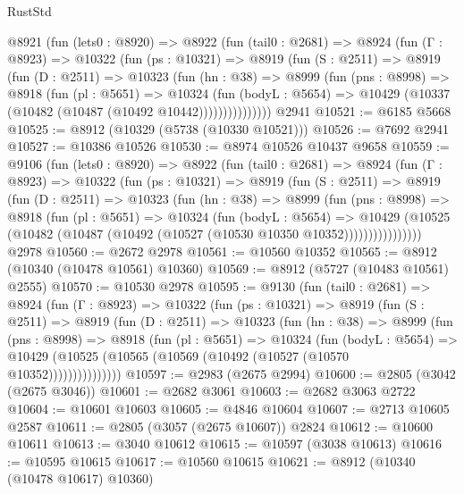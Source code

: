 \begin{lexlean}{RustStd}
\begin{coremodule}
    @8921
      (fun (lets0 : @8920) =>
      @8922
        (fun (tail0 : @2681) =>
        @8924
          (fun (Γ : @8923) =>
          @10322
            (fun (ps : @10321) =>
            @8919
              (fun (S : @2511) =>
              @8919
                (fun (D : @2511) =>
                @10323
                  (fun (hn : @38) =>
                  @8999
                    (fun (pns : @8998) =>
                    @8918
                      (fun (pl : @5651) =>
                      @10324
                        (fun (bodyL : @5654) =>
                        @10429 (@10337 (@10482 (@10487 (@10492 @10442)))))))))))))))
    @2941
@10521 := @6185 @5668
@10525 := @8912 (@10329 (@5738 (@10330 @10521)))
@10526 := @7692 @2941
@10527 := @10386 @10526
@10530 := @8974 @10526 @10437 @9658
@10559 := @9106
    (fun (lets0 : @8920) =>
    @8922
      (fun (tail0 : @2681) =>
      @8924
        (fun (Γ : @8923) =>
        @10322
          (fun (ps : @10321) =>
          @8919
            (fun (S : @2511) =>
            @8919
              (fun (D : @2511) =>
              @10323
                (fun (hn : @38) =>
                @8999
                  (fun (pns : @8998) =>
                  @8918
                    (fun (pl : @5651) =>
                    @10324
                      (fun (bodyL : @5654) =>
                      @10429
                        (@10525
                          (@10482 (@10487 (@10492 (@10527 (@10530 @10350 @10352))))))))))))))))
    @2978
@10560 := @2672 @2978
@10561 := @10560 @10352
@10565 := @8912 (@10340 (@10478 @10561) @10360)
@10569 := @8912 (@5727 (@10483 @10561) @2555)
@10570 := @10530 @2978
@10595 := @9130
    (fun (tail0 : @2681) =>
    @8924
      (fun (Γ : @8923) =>
      @10322
        (fun (ps : @10321) =>
        @8919
          (fun (S : @2511) =>
          @8919
            (fun (D : @2511) =>
            @10323
              (fun (hn : @38) =>
              @8999
                (fun (pns : @8998) =>
                @8918
                  (fun (pl : @5651) =>
                  @10324
                    (fun (bodyL : @5654) =>
                    @10429 (@10525 (@10565 (@10569 (@10492 (@10527 (@10570 @10352)))))))))))))))
@10597 := @2983 (@2675 @2994)
@10600 := @2805 (@3042 (@2675 @3046))
@10601 := @2682 @3061
@10603 := @2682 @3063 @2722
@10604 := @10601 @10603
@10605 := @4846 @10604
@10607 := @2713 @10605 @2587
@10611 := @2805 (@3057 (@2675 @10607)) @2824
@10612 := @10600 @10611
@10613 := @3040 @10612
@10615 := @10597 (@3038 @10613)
@10616 := @10595 @10615
@10617 := @10560 @10615
@10621 := @8912 (@10340 (@10478 @10617) @10360)

\end{coremodule}
\end{lexlean}
